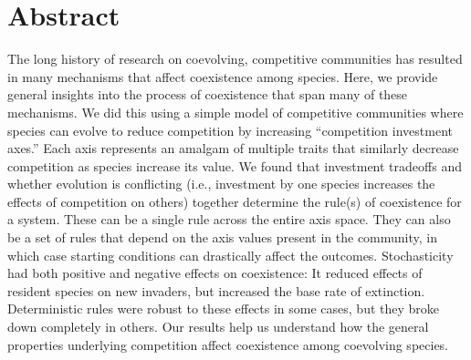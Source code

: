 \section*{Abstract}




The long history of research on coevolving, competitive communities has resulted in 
many mechanisms that affect coexistence among species.
Here, we provide general insights into the process of coexistence that span
many of these mechanisms.
We did this using a simple model of competitive communities where 
species can evolve to reduce competition by increasing
``competition investment axes.''
Each axis represents an amalgam of multiple traits that similarly decrease
competition as species increase its value.
We found that investment tradeoffs and whether evolution is conflicting
(i.e., investment by one species increases the effects of competition 
on others) together determine the rule(s) of coexistence for a system.
These can be a single rule across the entire axis space.
They can also be a set of rules that depend on the axis values present 
in the community, 
in which case starting conditions can drastically affect the outcomes.
Stochasticity had both positive and negative effects on coexistence:
It reduced effects of resident species on new invaders, 
but increased the base rate of extinction.
Deterministic rules were robust to these effects in some cases, but
they broke down completely in others.
Our results help us understand how the general properties underlying
competition affect coexistence among coevolving species.



